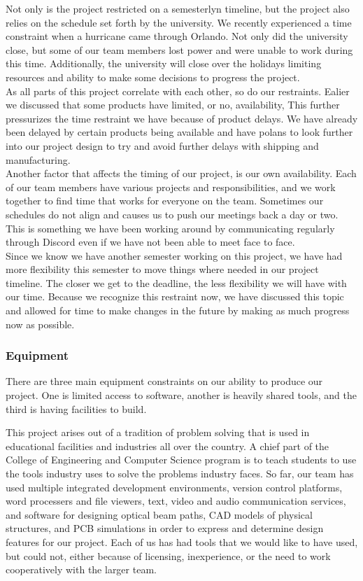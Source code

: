 Not only is the project restricted on a semesterlyn timeline, but the project also relies on the schedule set forth by the university. We recently experienced a time constraint when a hurricane came through Orlando. Not only did the university close, but some of our team members lost power and were unable to work during this time. Additionally, the university will close over the holidays limiting resources and ability to make some decisions to progress the project. \\

As all parts of this project correlate with each other, so do our restraints. Ealier we discussed that some products have limited, or no, availability, This further pressurizes the time restraint we have because of product delays. We have already been delayed by certain products being available and have polans to look further into our project design to try and avoid further delays with shipping and manufacturing. \\

Another factor that affects the timing of our project, is our own availability. Each of our team members have various projects and responsibilities, and we work together to find time that works for everyone on the team. Sometimes our schedules do not align and causes us to push our meetings back a day or two. This is something we have been working around by communicating regularly through Discord even if we have not been able to meet face to face.\\

Since we know we have another semester working on this project, we have had more flexibility this semester to move things where needed in our project timeline. The closer we get to the deadline, the less flexibility we will have with our time. Because we recognize this restraint now, we have discussed this topic and allowed for time to make changes in the future by making as much progress now as possible.\\ 

\subsubsection{Equipment}
There are three main equipment constraints on our ability to produce our project. One is limited access to software, another is heavily shared tools, and the third is having facilities to build.

This project arises out of a tradition of problem solving that is used in educational facilities and industries all over the country. A chief part of the College of Engineering and Computer Science program is to teach students to use the tools industry uses to solve the problems industry faces. So far, our team has used multiple integrated development environments, version control platforms, word processers and file viewers, text, video and audio communication services, and software for designing optical beam paths, CAD models of physical structures, and PCB simulations in order to express and determine design features for our project. Each of us has had tools that we would like to have used, but could not, either because of licensing, inexperience, or the need to work cooperatively with the larger team. 

